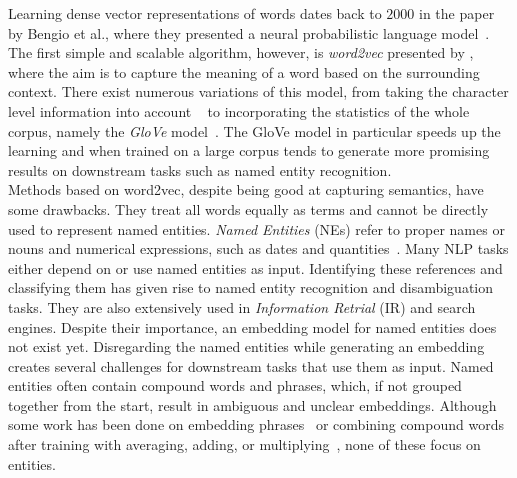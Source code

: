 Learning dense vector representations of words dates back to $2000$ in the paper by Bengio et al., where they presented a neural probabilistic language model~. The first simple and scalable algorithm, however, is \emph{word2vec} presented by , where the aim is to capture the meaning of a word based on the surrounding context. There exist numerous variations of this model, from taking the character level information into account ~ to incorporating the statistics of the whole corpus, namely the \emph{GloVe} model~. The GloVe model in particular speeds up the learning and when trained on a large corpus tends to generate more promising results on downstream tasks such as named entity recognition.\\
Methods based on word2vec, despite being good at capturing semantics, have some drawbacks. They treat all words equally as terms and cannot be directly used to represent named entities. \emph{Named Entities} (NEs) refer to proper names or nouns and numerical expressions, such as dates and quantities~.
Many NLP tasks either depend on or use named entities as input. Identifying these references and classifying them has given rise to named entity recognition and disambiguation tasks. They are also extensively used in \emph{Information Retrial} (IR) and search engines. Despite their importance, an embedding model for named entities does not exist yet. Disregarding the named entities while generating an embedding creates several challenges for downstream tasks that use them as input. Named entities often contain compound words and phrases, which, if not grouped together from the start, result in ambiguous and unclear embeddings. Although some work has been done on embedding phrases~ or combining compound words after training with averaging, adding, or multiplying~, none of these focus on entities. \\
